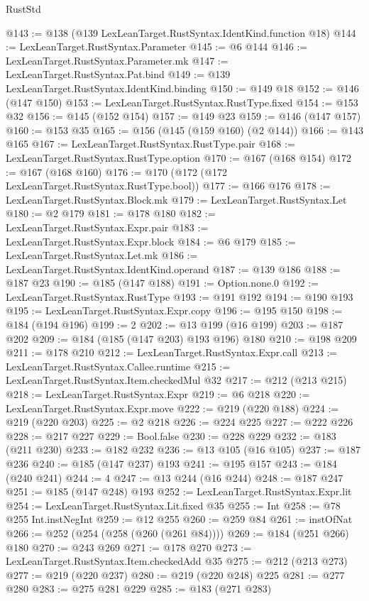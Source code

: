 \begin{lexlean}{RustStd}
\begin{coremodule}
@143 := @138 (@139 LexLeanTarget.RustSyntax.IdentKind.function @18)
@144 := LexLeanTarget.RustSyntax.Parameter
@145 := @6 @144
@146 := LexLeanTarget.RustSyntax.Parameter.mk
@147 := LexLeanTarget.RustSyntax.Pat.bind
@149 := @139 LexLeanTarget.RustSyntax.IdentKind.binding
@150 := @149 @18
@152 := @146 (@147 @150)
@153 := LexLeanTarget.RustSyntax.RustType.fixed
@154 := @153 @32
@156 := @145 (@152 @154)
@157 := @149 @23
@159 := @146 (@147 @157)
@160 := @153 @35
@165 := @156 (@145 (@159 @160) (@2 @144))
@166 := @143 @165
@167 := LexLeanTarget.RustSyntax.RustType.pair
@168 := LexLeanTarget.RustSyntax.RustType.option
@170 := @167 (@168 @154)
@172 := @167 (@168 @160)
@176 := @170 (@172 (@172 LexLeanTarget.RustSyntax.RustType.bool))
@177 := @166 @176
@178 := LexLeanTarget.RustSyntax.Block.mk
@179 := LexLeanTarget.RustSyntax.Let
@180 := @2 @179
@181 := @178 @180
@182 := LexLeanTarget.RustSyntax.Expr.pair
@183 := LexLeanTarget.RustSyntax.Expr.block
@184 := @6 @179
@185 := LexLeanTarget.RustSyntax.Let.mk
@186 := LexLeanTarget.RustSyntax.IdentKind.operand
@187 := @139 @186
@188 := @187 @23
@190 := @185 (@147 @188)
@191 := Option.none.{0}
@192 := LexLeanTarget.RustSyntax.RustType
@193 := @191 @192
@194 := @190 @193
@195 := LexLeanTarget.RustSyntax.Expr.copy
@196 := @195 @150
@198 := @184 (@194 @196)
@199 := 2
@202 := @13 @199 (@16 @199)
@203 := @187 @202
@209 := @184 (@185 (@147 @203) @193 @196) @180
@210 := @198 @209
@211 := @178 @210
@212 := LexLeanTarget.RustSyntax.Expr.call
@213 := LexLeanTarget.RustSyntax.Callee.runtime
@215 := LexLeanTarget.RustSyntax.Item.checkedMul @32
@217 := @212 (@213 @215)
@218 := LexLeanTarget.RustSyntax.Expr
@219 := @6 @218
@220 := LexLeanTarget.RustSyntax.Expr.move
@222 := @219 (@220 @188)
@224 := @219 (@220 @203)
@225 := @2 @218
@226 := @224 @225
@227 := @222 @226
@228 := @217 @227
@229 := Bool.false
@230 := @228 @229
@232 := @183 (@211 @230)
@233 := @182 @232
@236 := @13 @105 (@16 @105)
@237 := @187 @236
@240 := @185 (@147 @237) @193
@241 := @195 @157
@243 := @184 (@240 @241)
@244 := 4
@247 := @13 @244 (@16 @244)
@248 := @187 @247
@251 := @185 (@147 @248) @193
@252 := LexLeanTarget.RustSyntax.Expr.lit
@254 := LexLeanTarget.RustSyntax.Lit.fixed @35
@255 := Int
@258 := @78 @255 Int.instNegInt
@259 := @12 @255
@260 := @259 @84
@261 := instOfNat
@266 := @252 (@254 (@258 (@260 (@261 @84))))
@269 := @184 (@251 @266) @180
@270 := @243 @269
@271 := @178 @270
@273 := LexLeanTarget.RustSyntax.Item.checkedAdd @35
@275 := @212 (@213 @273)
@277 := @219 (@220 @237)
@280 := @219 (@220 @248) @225
@281 := @277 @280
@283 := @275 @281 @229
@285 := @183 (@271 @283)

\end{coremodule}
\end{lexlean}
